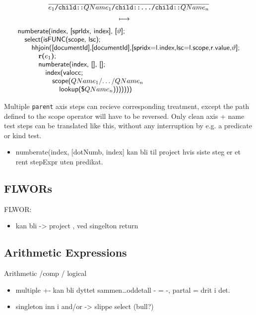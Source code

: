 \begin{equation}
\begin{array}{c}
\frac{}{\displaystyle e_{1}\texttt{/child::}QName_1\texttt{/child::\ldots/child::}QName_n} \\ 
\longmapsto \begin{array}{c}\mbox{\tiny } \\ \mbox{\tiny } \end{array} \\
\begin{array}{l}
\mbox{\textsf{numberate(index, [sprIdx, index], [}}\vartheta\mbox{\textsf{];}} \\ \quad
\mbox{\textsf{select(isFUNC(scope, lsc);}} \\ \quad \quad
\mbox{\textsf{hhjoin([documentId],[documentId],[spridx=l.index,lsc=l.scope,r.value,}}\vartheta\mbox{\textsf{];}}\\ \quad \quad \quad 
\mbox{\textbf{r(}}e_1\mbox{\textbf{)}\textsf{;}} \\ \quad \quad\quad
\mbox{\textsf{numberate(index, [], [];}}\\ \quad \quad\quad\quad
\mbox{\textsf{index(valocc;}} \\ \quad\quad\quad\quad\quad
\mbox{\textsf{scope(}}QName_1\mbox{\textsf{/\ldots/}}QName_n\\ \quad\quad\quad\quad\quad\quad
\mbox{\textsf{lookup(\$}}QName_n\mbox{\textsf{)))))))}}
\end{array}
\end{array}
\label{rule:trans:TD:pathChild}
\end{equation}

Multiple \texttt{parent} axis steps can recieve corresponding treatment, except the path defined to the
\textsf{scope} operator will have to be reversed. Only clean axis + name test steps can be translated
like this, without any interruption by e.g. a predicate or kind test.

\begin{itemize}
  \item numberate(index, [dotNumb, index] kan bli til project hvis siste steg er et rent stepExpr uten predikat.
\end{itemize}

\subsection{FLWORs}
\label{sect:trans:TD:simpl:flwor}        
  FLWOR:
  	\begin{itemize}
        \item  kan bli -> project , ved singelton return
      \end{itemize}

\subsection{Arithmetic Expressions}
\label{sect:trans:TD:simpl:arith}         
  Arithmetic /comp / logical
	\begin{itemize}
      \item multiple +- kan bli dyttet sammen\ldots oddetall - = -, partal = drit i det.
      \item singleton inn i and/or -> slippe select (bull?)
    \end{itemize}
